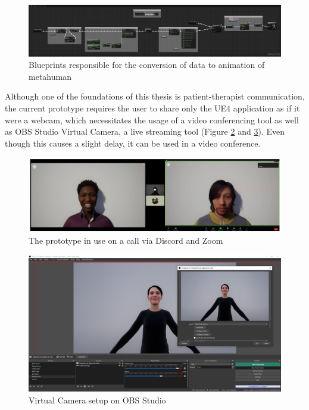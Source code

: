 \begin{figure}[!htb]
\includegraphics[width=\textwidth]{figures/facialConfig.png}
\centering
\caption{Blueprints responsible for the conversion of data to animation of metahuman}
\label{fig:blueprintAnimation}
\end{figure}

Although one of the foundations of this thesis is patient-therapist communication,  the current prototype requires the user to share only the UE4 application as if it were a webcam, which necessitates the usage of a video conferencing tool as well as OBS Studio Virtual Camera, a live streaming tool (Figure \ref{fig:prototype} and \ref{fig:obs}). Even though this causes a slight delay, it can be used in a video conference.

\begin{figure}[!htb]
\includegraphics[width=\textwidth]{figures/zoomAndDiscord.PNG}
\centering
\caption{The prototype in use on a call via Discord and Zoom}
\label{fig:prototype}
\end{figure}

\begin{figure}[!htb]
\includegraphics[width=\textwidth]{figures/streamingTool.PNG}
\centering
\caption{Virtual Camera setup on OBS Studio}
\label{fig:obs}
\end{figure}


